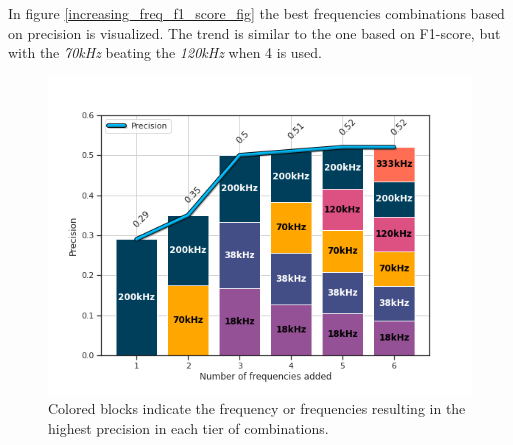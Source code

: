         In figure \ref{increasing_freq_f1_score_fig} the best frequencies combinations based on precision is visualized. The trend is similar to the one based on F1-score, but with the \textit{70kHz} beating the \textit{120kHz} when 4 is used. 
        \begin{figure}[H]
            \centering
            \includegraphics[scale=0.7]{figures/increasing_freq_precision.png}
            \caption[Best frequency combination - Precision]{Colored blocks indicate the frequency or frequencies resulting in the highest precision in each tier of combinations.}
          	\medskip 
            \label{increasing_freq_precision_score_fig}
        \end{figure}
        
